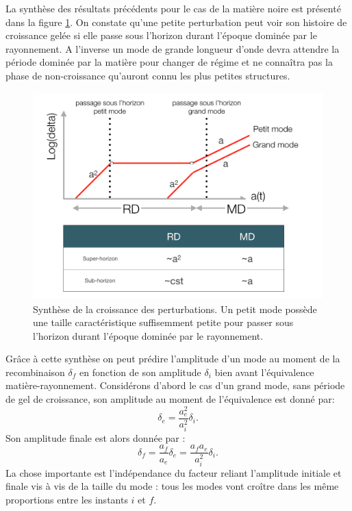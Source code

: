 La synthèse des résultats précédents pour le cas de la matière noire est présenté dans la figure \ref{f:perturb}. On constate qu'une petite perturbation peut voir son histoire de croissance gelée si elle passe sous l'horizon durant l'époque dominée par le rayonnement. A l'inverse un mode de grande longueur d'onde devra attendre la période dominée par la matière pour changer de régime et ne connaîtra pas la phase de non-croissance qu'auront connu les plus petites structures.

\begin{figure}[htbp]
	\centering
		\includegraphics[height=8cm]{figs/perturb.png}
		\caption[Synthèse de la croissance des perturbations]{Synthèse de la croissance des perturbations. Un petit mode possède une taille caractéristique suffisemment petite pour passer sous l'horizon durant l'époque dominée par le rayonnement.}
	\label{f:perturb}
\end{figure}

Grâce à cette synthèse on peut prédire l'amplitude d'un mode au moment de la recombinaison $\delta_f$ en fonction de son amplitude $\delta_i$ bien avant l'équivalence matière-rayonnement. Considérons d'abord le cas d'un grand mode, sans période de gel de croissance, son amplitude au moment de l'équivalence est donné par:
\begin{equation}
\delta_e=\frac{a_e^2}{a_i^2}\delta_i.
\end{equation}
Son amplitude finale est alors donnée par :
\begin{equation}
\delta_f=\frac{a_f}{a_e}\delta_e=\frac{a_f a_e}{a_i^2}\delta_i.
\end{equation}
La chose importante est l'indépendance du facteur reliant l'amplitude initiale et finale vis à vis de la taille du mode : tous les modes vont croître dans les même proportions entre les instants $i$ et $f$. 

